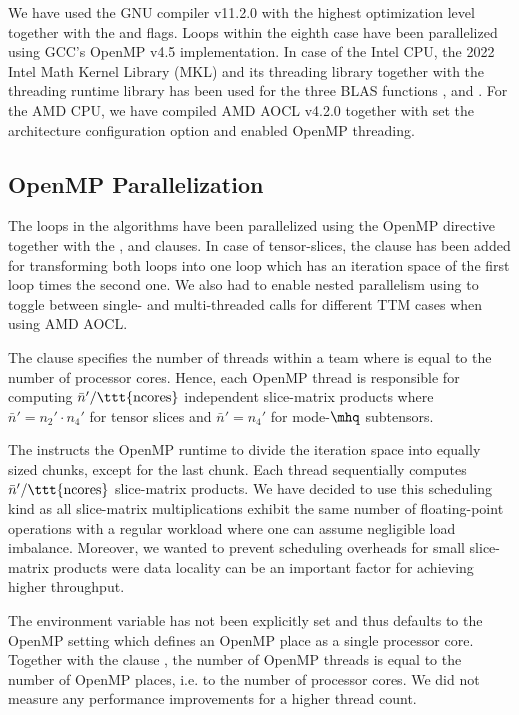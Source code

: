 We have used the GNU compiler v11.2.0 with the highest optimization level  together with the  and  flags. 
Loops within the eighth case have been parallelized using GCC's OpenMP v4.5 implementation.
In case of the Intel CPU, the 2022 Intel Math Kernel Library (MKL) and its threading library  together with the threading runtime library  has been used for the three BLAS functions ,  and .
For the AMD CPU, we have compiled AMD AOCL v4.2.0 together with set the  architecture configuration option and enabled OpenMP threading.


\subsection{OpenMP Parallelization}
The loops in the  algorithms have been parallelized using the OpenMP directive  together with the ,  and \allowbreak{} clauses.
In case of tensor-slices, the  clause has been added for transforming both loops into one loop which has an iteration space of the first loop times the second one. 
We also had to enable nested parallelism using  to toggle between single- and multi-threaded  calls for different TTM cases when using AMD AOCL.

The  clause specifies the number of threads within a team where  is equal to the number of processor cores. 
Hence, each OpenMP thread is responsible for computing $\bar{n}' / \text{\ttt{ncores}}$ independent slice-matrix products where $\bar{n}' = n_2' \cdot n_4'$ for tensor slices and $\bar{n}' = n_4'$ for mode-$\mhq$ subtensors.

The  instructs the OpenMP runtime to divide the iteration space into equally sized chunks, except for the last chunk.
Each thread sequentially computes $ \bar{n}' / \text{\ttt{ncores}}$ slice-matrix products.
We have decided to use this scheduling kind as all slice-matrix multiplications exhibit the same number of floating-point operations with a regular workload where one can assume negligible load imbalance.
Moreover, we wanted to prevent scheduling overheads for small slice-matrix products were data locality can be an important factor for achieving higher throughput.

The  environment variable has not been explicitly set and thus defaults to the OpenMP  setting which defines an OpenMP place as a single processor core. %
Together with the clause , the number of OpenMP threads is equal to the number of OpenMP places, i.e. to the number of processor cores.
We did not measure any performance improvements for a higher thread count.

